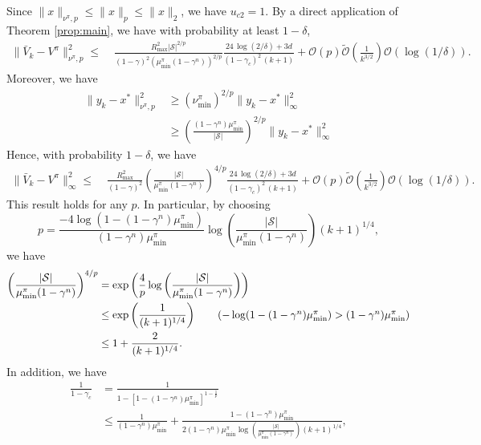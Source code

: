 \documentclass[letterpaper, 10 pt]{article}
\begin{document}
Since $\|x\|_{\nu^\pi,p}\leq \|x\|_{p}\leq \|x\|_2$, we have $u_{c2}=1$. By a direct application of Theorem \ref{prop:main}, we have with probability at least $1-\delta$,
\begin{align*}
\|\bar{V}_k-V^\pi\|_{\nu^\pi,p}^2 \le\; & \frac{R_{\max}^2|\mathcal{S}|^{2/p}}{(1-\gamma)^2(\mu_{\min}^\pi(1-\gamma^n))^{2/p}}\frac{24 \,\log(2/\delta)+3 d }{(1-\gamma_c)^2\,(k+1)} + \mathcal{O}(p)\tilde{\mathcal{O}}\left(\frac{1}{k^{3/2}}  \right) \mathcal{O}(\log(1/\delta)).
\end{align*}
Moreover, we have 
\begin{align*}
    \|y_k-x^*\|_{\nu^\pi,p}^2&\geq (\nu^\pi_{\min})^{2/p}\|y_k-x^*\|_{\infty}^2\\
    &\geq \left(\frac{(1-\gamma^n)\mu^\pi_{\min}}{|\mathcal{S}|}\right)^{2/p}\|y_k-x^*\|_{\infty}^2
\end{align*}
Hence, with probability $1-\delta$, we have
\begin{align}
\|\bar{V}_k-V^\pi\|_{\infty}^2 \le\; & \frac{R_{\max}^2}{(1-\gamma)^2}\left(\frac{|\mathcal{S}|}{\mu_{\min}^\pi(1-\gamma^n)}\right)^{4/p}\frac{24 \,\log(2/\delta)+3 d }{(1-\gamma_c)^2\,(k+1)} + \mathcal{O}(p)\tilde{\mathcal{O}}\left(\frac{1}{k^{3/2}}  \right) \mathcal{O}(\log(1/\delta)).\label{eq:error_infinity_bound}
\end{align}
This result holds for any $p$. In particular, by choosing
\[ p=\frac{-4\log\left(1-(1-\gamma^n)\mu^\pi_{\min}\right)}{(1-\gamma^n)\mu^\pi_{\min}} \log\left(\frac{|\mathcal{S}|}{\mu_{\min}^\pi(1-\gamma^n)}\right)(k+1)^{1/4}, \]
we have
\begin{align}
    \left(\frac{ |\mathcal{S}|}{\mu_{\min}^\pi(1-\gamma^n)}\right)^{4/p} &= \exp\left(\frac{4}{p}\log\left(\frac{ |\mathcal{S}|}{\mu_{\min}^\pi(1-\gamma^n)}\right)\right)\nonumber\\
    &\leq \exp\left(\frac{1}{(k+1)^{1/4}}\right)\tag{$-\log(1-(1-\gamma^n)\mu^\pi_{\min})>(1-\gamma^n)\mu^\pi_{\min}$}\nonumber\\
    &\leq 1+ \frac{2}{(k+1)^{1/4}}.\label{eq:power_p_bound}
\end{align}
In addition, we have
\begin{align}
    \frac{1}{1-\gamma_c} &= \frac{1}{1-\left[1-(1-\gamma^n)\mu^\pi_{\min}\right]^{1-\frac{1}{p}}}\nonumber\\
    &\leq \frac{1}{(1-\gamma^n)\mu^\pi_{\min}} + \frac{1-(1-\gamma^n)\mu^\pi_{\min}}{2(1-\gamma^n)\mu^\pi_{\min}\log\left(\frac{|\mathcal{S}|}{\mu_{\min}^\pi(1-\gamma^n)}\right)(k+1)^{1/4}},\label{eq:gamma_c_bound}
\end{align}
\end{document}
